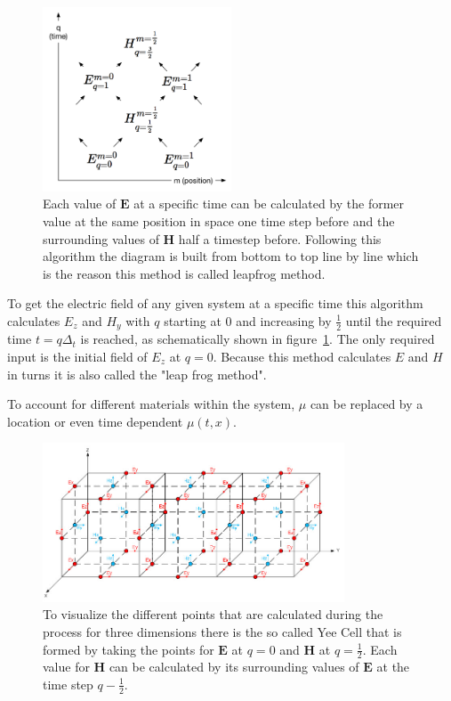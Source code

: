 \begin{figure}[!h]
  \centering
  \includegraphics[width=0.5\textwidth]{./images/space-time-cell.png}
  \caption{Each value of $\mathbf{E}$ at a specific time can be calculated by the former value at the same position in space one time step before and the surrounding values of $\mathbf{H}$ half a timestep before. Following this algorithm the diagram is built from bottom to top line by line which is the reason this method is called leapfrog method.}
  \label{fig:leapfrog}
\end{figure}

To get the electric field of any given system at a specific time this algorithm calculates $E_z$ and $H_y$ with $q$ starting at 0 and increasing by $\frac{1}{2}$ until the required time $t = q\Delta_t$ is reached, as schematically shown in figure~\ref{fig:leapfrog}. The only required input is the initial field of $E_z$ at $q = 0$. Because this method calculates $E$ and $H$ in turns it is also called the "leap frog method".

To account for different materials within the system, $\mu$ can be replaced by a location or even time dependent $\mu(t, x)$.

\begin{figure}[!h]
  \centering
  \includegraphics[width=0.8\textwidth]{./images/yeecell.jpg}
  \caption{To visualize the different points that are calculated during the process for three dimensions there is the so called Yee Cell that is formed by taking the points for $\mathbf{E}$ at $q=0$ and $\mathbf{H}$ at $q=\frac{1}{2}$. Each value for $\mathbf{H}$ can be calculated by its surrounding values of $\mathbf{E}$ at the time step $q-\frac{1}{2}$.}
  \label{fig:yeecell}
\end{figure}

